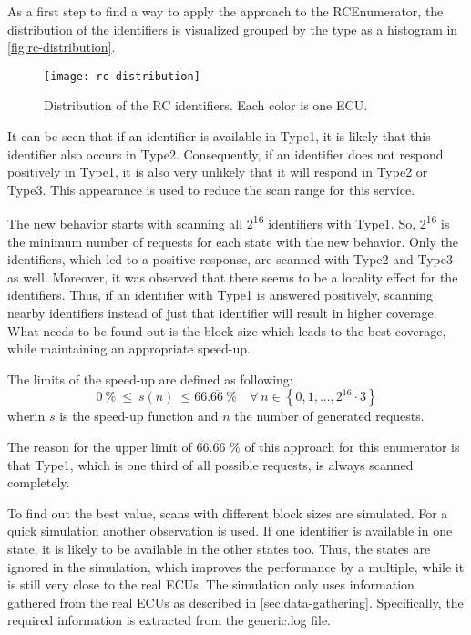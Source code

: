 As a first step to find a way to apply the approach to the RCEnumerator, the distribution of the identifiers is visualized grouped by the type as a histogram in \autoref{fig:rc-distribution}.

\begin{figure}[h]
    \centering
    \texttt{[image: rc-distribution]}
    \caption{Distribution of the RC identifiers. Each color is one ECU.}
    \label{fig:rc-distribution}
\end{figure}

It can be seen that if an identifier is available in Type1, it is likely that this identifier also occurs in Type2. Consequently, if an identifier does not respond positively in Type1, it is also very unlikely that it will respond in Type2 or Type3. This appearance is used to reduce the scan range for this service.

The new behavior starts with scanning all 2\textsuperscript{16} identifiers with Type1. So, 2\textsuperscript{16} is the minimum number of requests for each state with the new behavior. Only the identifiers, which led to a positive response, are scanned with Type2 and Type3 as well. Moreover, it was observed that there seems to be a locality effect for the identifiers. Thus, if an identifier with Type1 is answered positively, scanning nearby identifiers instead of just that identifier will result in higher coverage. What needs to be found out is the block size which leads to the best coverage, while maintaining an appropriate speed-up.

The limits of the speed-up are defined as following:
\[ 0\ \% \ \leq\  s(n)\  \leq 66.\overline{66}\ \% \quad \forall \  n \in \left\{0, 1, ..., 2^{16} \cdot 3\right\} \]
wherin $s$ is the speed-up function and $n$ the number of generated requests.

The reason for the upper limit of $66.\overline{66}$ \% of this approach for this enumerator is that Type1, which is one third of all possible requests, is always scanned completely.

To find out the best value, scans with different block sizes are simulated. For a quick simulation another observation is used. If one identifier is available in one state, it is likely to be available in the other states too. Thus, the states are ignored in the simulation, which improves the performance by a multiple, while it is still very close to the real ECUs. The simulation only uses information gathered from the real ECUs as described in \autoref{sec:data-gathering}. Specifically, the required information is extracted from the generic.log file.

